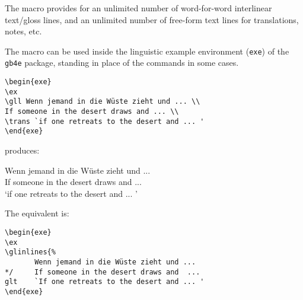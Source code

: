 \documentclass{article}
\begin{document}
%
%
%
	\mfssetpreformat{}




The  macro provides for an unlimited number of word-for-word interlinear text/gloss lines, and an unlimited number of free-form text lines for translations, notes, etc.

The macro can be used inside the linguistic example environment (\verb|exe|) of the \verb|gb4e| package, standing in place of the  commands in some cases.

\begin{verbatim}
\begin{exe}
\ex
\gll Wenn jemand in die Wüste zieht und ... \\
If someone in the desert draws and ... \\
\trans `if one retreats to the desert and ... '
\end{exe}
\end{verbatim}

produces:

\begin{exe}
\ex
\gll Wenn jemand in die Wüste zieht und ... \\
If someone in the desert draws and ... \\
\trans `if one retreats to the desert and ... '
\end{exe}


The  equivalent is:

\begin{verbatim}
\begin{exe}
\ex
\glinlines{%
       Wenn jemand in die Wüste zieht und ... 
*/     If someone in the desert draws and  ... 
glt    `If one retreats to the desert and ... '
\end{exe}
\end{verbatim}
\end{document}
